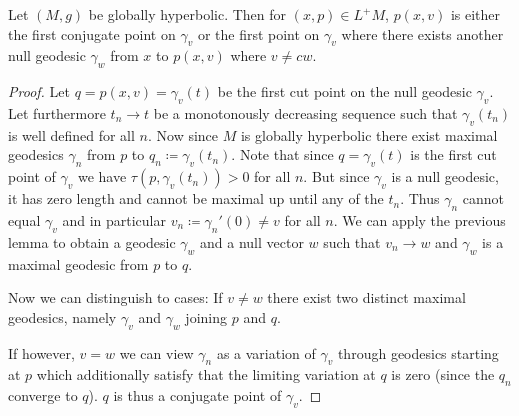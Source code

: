 \begin{theorem}\label{thm:cutpointcharact}
Let $(M,g)$ be globally hyperbolic.
Then for $(x,p)\in L^+M$, $p(x,v)$ is either the first conjugate point on $\gamma_v$ or the first point on $\gamma_v$ where there exists another null geodesic $\gamma_w$ from $x$ to $p(x,v)$ where $v \neq cw$.
\end{theorem}
\begin{proof}
Let $q=p(x,v)=\gamma_v(t)$ be the first cut point on the null geodesic $\gamma_v$. Let furthermore $t_n\to t$ be a monotonously decreasing sequence such that $\gamma_v(t_n)$ is well defined for all $n$. Now since $M$ is globally hyperbolic there exist maximal geodesics $\gamma_n$ from $p$ to $q_n\coloneqq\gamma_v(t_n)$. Note that since $q=\gamma_v(t)$ is the first cut point of $\gamma_v$ we have $\tau(p,\gamma_v(t_n))>0$ for all $n$. But since $\gamma_v$ is a null geodesic, it has zero length and cannot be maximal up until any of the $t_n$. Thus $\gamma_n$ cannot equal $\gamma_v$ and in particular $v_n\coloneqq\gamma_n'(0)\neq v$ for all $n$. We can apply the previous lemma to obtain a geodesic $\gamma_w$ and a null vector $w$ such that $v_n\to w$ and $\gamma_w$ is a maximal geodesic from $p$ to $q$. 

Now we can distinguish to cases:
If $v\neq w$ there exist two distinct maximal geodesics, namely $\gamma_v$ and $\gamma_w$ joining $p$ and $q$.

If however, $v=w$ we can view $\gamma_n$ as a variation of $\gamma_v$ through geodesics starting at $p$ which additionally satisfy that the limiting variation at $q$ is zero (since the $q_n$ converge to $q$). $q$ is thus a conjugate point of $\gamma_v$.
\end{proof}


